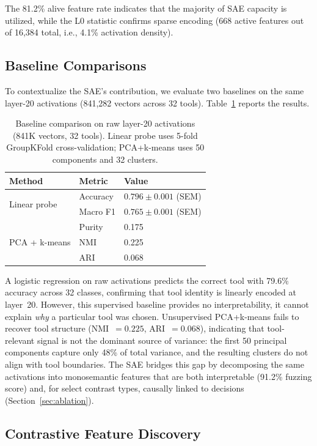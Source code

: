 \documentclass[runningheads]{llncs}
\begin{document}
The 81.2\% alive feature rate indicates that the majority of SAE capacity is utilized, while the L0 statistic confirms sparse encoding (668 active features out of 16,384 total, i.e., 4.1\% activation density).

\subsection{Baseline Comparisons}

To contextualize the SAE's contribution, we evaluate two baselines on the same layer-20 activations (841,282 vectors across 32 tools). Table~\ref{tab:baselines} reports the results.

\begin{table}[t]
\caption{Baseline comparison on raw layer-20 activations (841K vectors, 32 tools). Linear probe uses 5-fold GroupKFold cross-validation; PCA+k-means uses 50 components and 32 clusters.}
\label{tab:baselines}
\centering
\begin{tabular}{lll}
\toprule
Method & Metric & Value \\
\midrule
\multirow{2}{*}{Linear probe} & Accuracy & $0.796 \pm 0.001$ (SEM) \\
 & Macro F1 & $0.765 \pm 0.001$ (SEM) \\
\midrule
\multirow{3}{*}{PCA + k-means} & Purity & 0.175 \\
 & NMI & 0.225 \\
 & ARI & 0.068 \\
\bottomrule
\end{tabular}
\end{table}

A logistic regression on raw activations predicts the correct tool with 79.6\% accuracy across 32 classes, confirming that tool identity is linearly encoded at layer~20. However, this supervised baseline provides no interpretability, it cannot explain \emph{why} a particular tool was chosen. Unsupervised PCA+k-means fails to recover tool structure (NMI~$= 0.225$, ARI~$= 0.068$), indicating that tool-relevant signal is not the dominant source of variance: the first 50 principal components capture only 48\% of total variance, and the resulting clusters do not align with tool boundaries. The SAE bridges this gap by decomposing the same activations into monosemantic features that are both interpretable (91.2\% fuzzing score) and, for select contrast types, causally linked to decisions (Section~\ref{sec:ablation}).

\subsection{Contrastive Feature Discovery}
\end{document}
